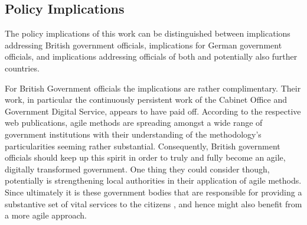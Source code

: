 \subsection{Policy Implications}\label{Policy Implications}
The policy implications of this work can be distinguished between implications addressing British government officials, implications for German government officials, and implications addressing officials of both and potentially also further countries.

For British Government officials the implications are rather complimentary. Their work, in particular the continuously persistent work of the Cabinet Office and Government Digital Service, appears to have paid off. According to the respective web publications, agile methods are spreading amongst a wide range of government institutions with their understanding of the methodology's particularities seeming rather substantial. Consequently, British government officials should keep up this spirit in order to truly and fully become an agile, digitally transformed government. One thing they could consider though, potentially is strengthening local authorities in their application of agile methods. Since ultimately it is these government bodies that are responsible for providing a substantive set of vital services to the citizens \parencite{LocalGovernmentAssociation2020}, and hence might also benefit from a more agile approach.

